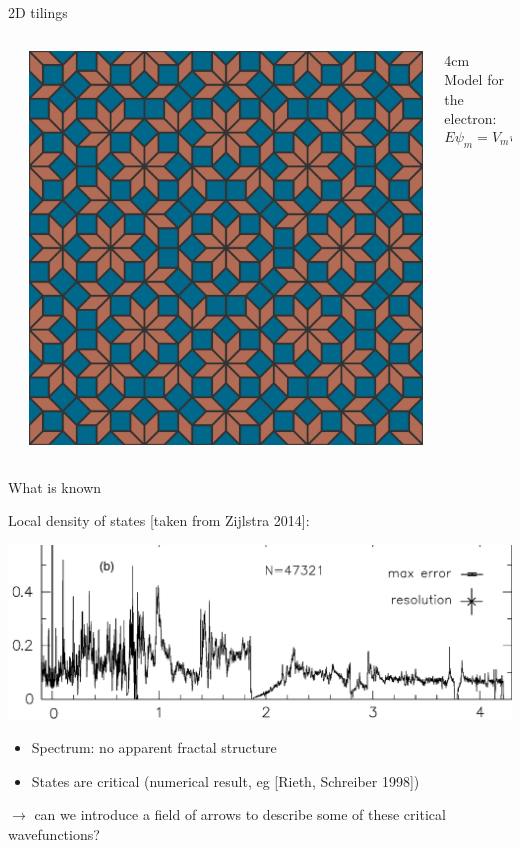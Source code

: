 \documentclass[xcolor=x11names,compress,professionalfonts, aspectratio=169]{beamer}
\renewcommand{\(}{\begin{columns}}
\renewcommand{\)}{\end{columns}}
\newcommand{\<}[1]{\begin{column}{#1}}
\renewcommand{\>}{\end{column}}
\begin{document}
\begin{frame}{2D tilings}
\begin{columns}
\begin{column}{5cm}
{}
\end{column}
\begin{column}{5cm}
{\centering
\includegraphics[scale=.09]{img/ammann-beenker.png}

}
\end{column}
\<{4cm}
Model for the electron:
\[
	E \psi_m = V_m \psi_m + t\sum_{n \in V(m)} \psi_n
\]
\>
\end{columns}

\end{frame}

\begin{frame}{What is known}

Local density of states [taken from Zijlstra 2014]:

{\centering
\includegraphics[scale=.1]{img/idos_AB_small.png}

}
\begin{itemize}
	\item Spectrum: no apparent fractal structure
	\item States are critical (numerical result, eg [Rieth, Schreiber 1998])
\end{itemize}
$\rightarrow$ can we introduce a field of arrows to describe some of these critical wavefunctions?
\end{frame}
\end{document}

